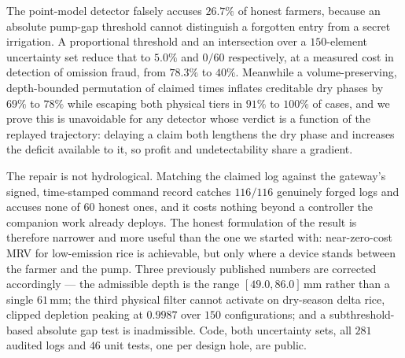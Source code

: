 \documentclass[journal]{IEEEtran}
\begin{document}
The point-model detector falsely accuses $26.7\%$ of honest farmers, because an
absolute pump-gap threshold cannot distinguish a forgotten entry from a secret
irrigation. A proportional threshold and an intersection over a $150$-element
uncertainty set reduce that to $5.0\%$ and $0/60$ respectively, at a measured
cost in detection of omission fraud, from $78.3\%$ to $40\%$. Meanwhile a
volume-preserving, depth-bounded permutation of claimed times inflates creditable
dry phases by $69\%$ to $78\%$ while escaping both physical tiers in $91\%$ to
$100\%$ of cases, and we prove this is unavoidable for any detector whose verdict
is a function of the replayed trajectory: delaying a claim both lengthens the dry
phase and increases the deficit available to it, so profit and undetectability
share a gradient.

The repair is not hydrological. Matching the claimed log against the gateway's
signed, time-stamped command record catches $116/116$ genuinely forged logs and
accuses none of $60$ honest ones, and it costs nothing beyond a controller the
companion work already deploys. The honest formulation of the result is
therefore narrower and more useful than the one we started with: near-zero-cost
MRV for low-emission rice is achievable, but only where a device stands between
the farmer and the pump. Three previously published numbers are corrected
accordingly --- the admissible depth is the range $[49.0,86.0]$\,mm rather than a
single $61$\,mm; the third physical filter cannot activate on dry-season delta
rice, clipped depletion peaking at $0.9987$ over $150$ configurations; and a
subthreshold-based absolute gap test is inadmissible. Code, both uncertainty
sets, all $281$ audited logs and $46$ unit tests, one per design hole, are
public.

\appendix

\begin{table}[!t]
\centering
\caption{The three forgeable quantities of \eqref{eq:three} and which fraud class alters each. ``true'' means the quantity is preserved, so the corresponding defence is blind by Prop.~\ref{prop:blind}.}
\label{tab:threat}
\footnotesize

\end{table}

\begin{table}[!t]
\centering
\caption{False accusation on honest logs, the property the scheme is sold on. Paper conditions reproduce the prior $0/60$; field conditions expose the absolute gap threshold.}
\label{tab:falseacc}
\footnotesize

\end{table}
\end{document}
